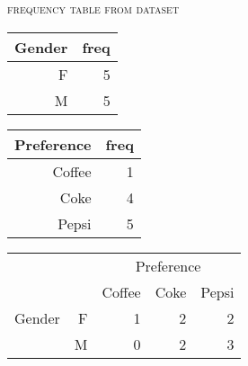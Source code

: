 \documentclass[dvipdfmx, serif,handout]{beamer}
\begin{document}
\begin{frame}{\textsc{frequency table from dataset}}

\begin{minipage}{0.4\hsize}
\footnotesize
\begin{table}[ht]
\centering
\begin{tabular}{rr}
  \hline
Gender & freq  \\ 
  \hline
F &   5 \\ 
  M &   5 \\ 
   \hline
\end{tabular}
\end{table}
\end{minipage}
\begin{minipage}{0.4\hsize}
\begin{table}[ht]
\centering
\begin{tabular}{rr}
  \hline
Preference & freq \\ 
  \hline
Coffee &   1 \\ 
  Coke &   4 \\ 
  Pepsi &   5 \\ 
   \hline
\end{tabular}
\end{table}
\end{minipage}

\begin{table}[ht]
\centering
\begin{tabular}{rrrrr}
  \hline
 && \multicolumn{3}{c}{Preference}\\ 
 && Coffee & Coke & Pepsi \\ 
  \hline
Gender &F &   1 &   2 &   2 \\ 
 & M &   0 &   2 &   3 \\ 
   \hline
\end{tabular}
\end{table}



\end{frame}
\end{document}

